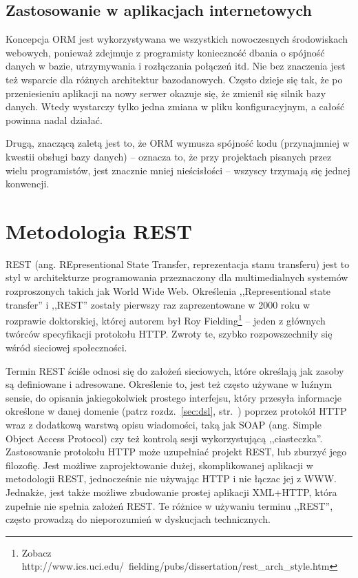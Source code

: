 \documentclass[a4paper,12pt,oneside]{report}
\begin{document}
\subsection{Zastosowanie w aplikacjach internetowych}
\label{subsec:orm-web}
Koncepcja ORM jest wykorzystywana we wszystkich nowoczesnych środowiskach webowych, ponieważ zdejmuje z programisty konieczność dbania o spójność danych w bazie, utrzymywania i rozłączania połączeń itd. Nie bez znaczenia jest też wsparcie dla różnych architektur bazodanowych. Często dzieje się tak, że po przeniesieniu aplikacji na nowy serwer okazuje się, że zmienił się silnik bazy danych. Wtedy wystarczy tylko jedna zmiana w pliku konfiguracyjnym, a całość powinna nadal działać.

Drugą, znaczącą zaletą jest to, że ORM wymusza spójność kodu (przynajmniej w kwestii obsługi bazy danych) -- oznacza to, że przy projektach pisanych przez wielu programistów, jest znacznie mniej nieścisłości -- wszyscy trzymają się jednej konwencji.

\section{Metodologia REST}
\label{sec:rest}
REST (ang. REpresentional State Transfer, reprezentacja stanu transferu) jest to styl w architekturze programowania przeznaczony dla multimedialnych systemów rozproszonych takich jak World Wide Web. Określenia ,,Representional state transfer'' i ,,REST'' zostały pierwszy raz zaprezentowane w 2000 roku w rozprawie doktorskiej, której autorem był Roy Fielding\footnote{Zobacz http://www.ics.uci.edu/~fielding/pubs/dissertation/rest\_arch\_style.htm} -- jeden z głównych twórców specyfikacji protokołu HTTP. Zwroty te, szybko rozpowszechniły się wśród sieciowej społeczności.

Termin REST ściśle odnosi się do założeń sieciowych, które określają jak zasoby są definiowane i adresowane. Określenie to, jest też często używane w luźnym sensie, do opisania jakiegokolwiek prostego interfejsu, który przesyła informacje określone w danej domenie (patrz rozdz.~\ref{sec:dsl}, str.~\pageref{sec:dsl}) poprzez protokół HTTP wraz z dodatkową warstwą opisu wiadomości, taką jak SOAP (ang. Simple Object Access Protocol) czy też kontrolą sesji wykorzystującą ,,ciasteczka''. Zastosowanie protokołu HTTP może uzupełniać projekt REST, lub zburzyć jego filozofię. Jest możliwe zaprojektowanie dużej, skomplikowanej aplikacji w metodologii REST, jednocześnie nie używając HTTP i nie łączac jej z WWW. Jednakże, jest także możliwe zbudowanie prostej aplikacji XML+HTTP, która zupełnie nie spełnia założeń REST. Te różnice w używaniu terminu ,,REST'', często prowadzą do nieporozumień w dyskucjach technicznych.
\end{document}
